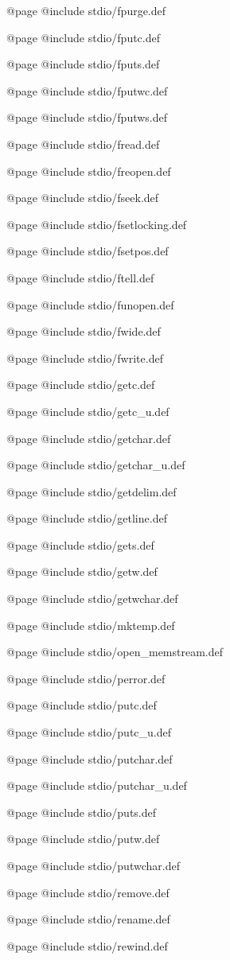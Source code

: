 @page
@include stdio/fpurge.def

@page
@include stdio/fputc.def

@page
@include stdio/fputs.def

@page
@include stdio/fputwc.def

@page
@include stdio/fputws.def

@page
@include stdio/fread.def

@page
@include stdio/freopen.def

@page
@include stdio/fseek.def

@page
@include stdio/fsetlocking.def

@page
@include stdio/fsetpos.def

@page
@include stdio/ftell.def

@page
@include stdio/funopen.def

@page
@include stdio/fwide.def

@page
@include stdio/fwrite.def

@page
@include stdio/getc.def

@page
@include stdio/getc_u.def

@page
@include stdio/getchar.def

@page
@include stdio/getchar_u.def

@page
@include stdio/getdelim.def

@page
@include stdio/getline.def

@page
@include stdio/gets.def

@page
@include stdio/getw.def

@page
@include stdio/getwchar.def

@page
@include stdio/mktemp.def

@page
@include stdio/open_memstream.def

@page
@include stdio/perror.def

@page
@include stdio/putc.def

@page
@include stdio/putc_u.def

@page
@include stdio/putchar.def

@page
@include stdio/putchar_u.def

@page
@include stdio/puts.def

@page
@include stdio/putw.def

@page
@include stdio/putwchar.def

@page
@include stdio/remove.def

@page
@include stdio/rename.def

@page
@include stdio/rewind.def


